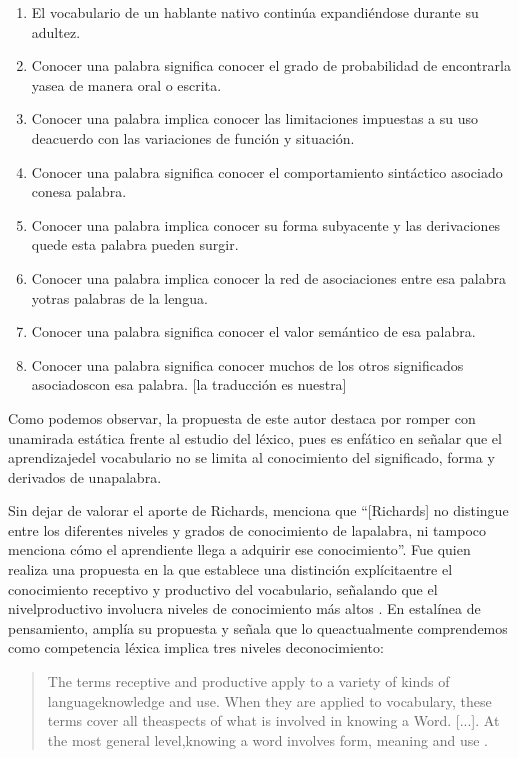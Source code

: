 \documentclass{textolivre}
\begin{document}
\begin{enumerate}
\item El vocabulario de un hablante nativo continúa expandiéndose durante su adultez.
\item Conocer una palabra significa conocer el grado de probabilidad de encontrarla yasea de manera oral o escrita.
\item Conocer   una   palabra   implica   conocer   las   limitaciones   impuestas   a   su   uso   deacuerdo con las variaciones de función y situación.
\item Conocer una palabra significa conocer el comportamiento sintáctico asociado conesa palabra.
\item Conocer una palabra implica conocer su forma subyacente y las derivaciones quede esta palabra pueden surgir.
\item Conocer una  palabra implica conocer la red de  asociaciones entre  esa  palabra  yotras palabras de la lengua.
\item Conocer una palabra significa conocer el valor semántico de esa palabra.
\item Conocer una palabra significa conocer muchos de los otros significados asociadoscon esa palabra. [la traducción es nuestra]
\end{enumerate}

Como podemos observar, la propuesta de este autor destaca por romper con
unamirada estática frente al estudio del léxico, pues es enfático en señalar
que el aprendizajedel vocabulario no se limita al conocimiento del significado,
forma y derivados de unapalabra.

Sin dejar de valorar el aporte de Richards, \textcite[p. 15]{arancibia} menciona
que “[Richards] no distingue entre los diferentes niveles y grados de
conocimiento de lapalabra, ni tampoco menciona cómo el aprendiente llega a
adquirir ese conocimiento”. Fue \textcite{natio1990} quien realiza una propuesta en la
que establece una distinción explícitaentre el conocimiento receptivo y
productivo del vocabulario, señalando que el nivelproductivo involucra niveles
de conocimiento más altos \cite{Choudhury2015}. En estalínea de pensamiento,
\textcite{natio2001} amplía su propuesta y señala que lo queactualmente comprendemos
como competencia léxica implica tres niveles deconocimiento:

\begin{quote}
The terms receptive and productive apply to a variety of kinds of
languageknowledge and use. When they are applied to vocabulary, these terms
cover all theaspects of what is involved in knowing a Word. [...]. At the most
general level,knowing a word involves form, meaning and use \cite[p. 40]{natio2001}.
\end{quote}
\end{document}
